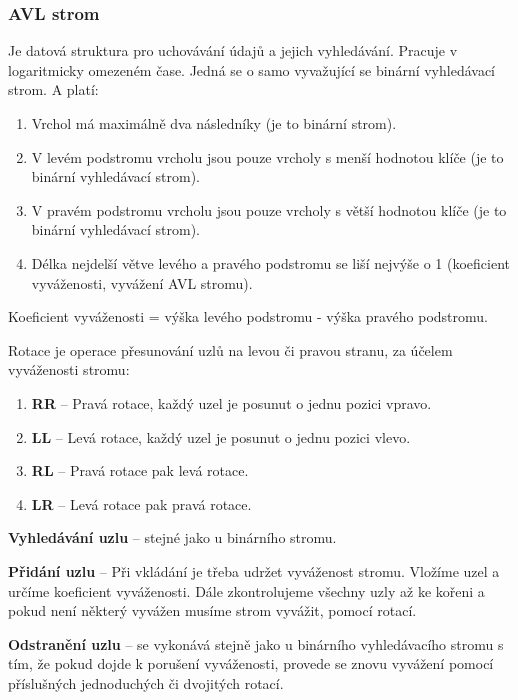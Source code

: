 \subsubsection{AVL strom}
Je datová struktura pro uchovávání údajů a jejich vyhledávání. Pracuje v logaritmicky omezeném čase. Jedná se o samo vyvažující se binární vyhledávací strom. A platí:
\begin{enumerate}
\item Vrchol má maximálně dva následníky (je to binární strom).
\item V levém podstromu vrcholu jsou pouze vrcholy s menší hodnotou klíče (je to binární vyhledávací strom).
\item V pravém podstromu vrcholu jsou pouze vrcholy s větší hodnotou klíče (je to binární vyhledávací strom).
\item Délka nejdelší větve levého a pravého podstromu se liší nejvýše o 1 (koeficient vyváženosti, vyvážení AVL stromu).
\end{enumerate}

Koeficient vyváženosti = výška levého podstromu  - výška pravého podstromu.

Rotace je operace přesunování uzlů na levou či pravou stranu, za účelem vyváženosti stromu:
\begin{enumerate}
\item \textbf{RR} -- Pravá rotace, každý uzel je posunut o jednu pozici vpravo.
\item \textbf{LL} -- Levá rotace, každý uzel je posunut o jednu pozici vlevo.
\item \textbf{RL} -- Pravá rotace pak levá rotace.
\item \textbf{LR} -- Levá rotace pak pravá rotace.
\end{enumerate}


\textbf{Vyhledávání uzlu} -- stejné jako u binárního stromu.


\textbf{Přidání uzlu} -- Při vkládání je třeba udržet vyváženost stromu. Vložíme uzel a určíme koeficient vyváženosti. Dále zkontrolujeme všechny uzly až ke kořeni a pokud není některý vyvážen musíme strom vyvážit, pomocí rotací.


\textbf{Odstranění uzlu} -- se vykonává stejně jako u binárního vyhledávacího stromu s tím, že pokud dojde k porušení vyváženosti, provede se znovu vyvážení pomocí příslušných jednoduchých či dvojitých rotací.




